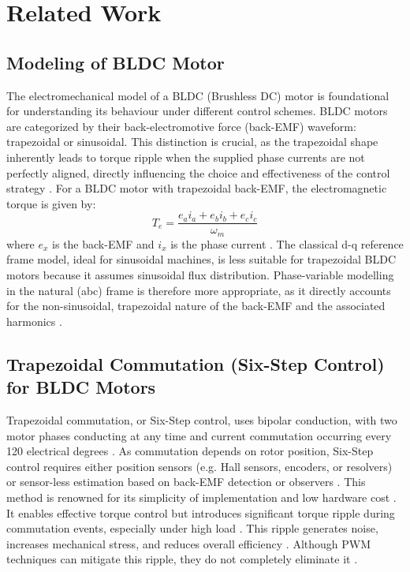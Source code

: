 \section{Related Work}
\label{sec:relatedwork}

\subsection{Modeling of BLDC Motor}
The electromechanical model of a BLDC (Brushless DC) motor is foundational for understanding its behaviour under different control schemes. BLDC motors are categorized by their back-electromotive force (back-EMF) waveform: trapezoidal or sinusoidal. This distinction is crucial, as the trapezoidal shape inherently leads to torque ripple when the supplied phase currents are not perfectly aligned, directly influencing the choice and effectiveness of the control strategy \cite{patil_analysis_2025}. For a BLDC motor with trapezoidal back-EMF, the electromagnetic torque is given by:
\[
T_e = \frac{e_a i_a + e_b i_b + e_c i_c}{\omega_m}
\]
where \( e_x \) is the back-EMF and \( i_x \) is the phase current \cite{li_quantitative_2019}. The classical d-q reference frame model, ideal for sinusoidal machines, is less suitable for trapezoidal BLDC motors because it assumes sinusoidal flux distribution. Phase-variable modelling in the natural (abc) frame is therefore more appropriate, as it directly accounts for the non-sinusoidal, trapezoidal nature of the back-EMF and the associated harmonics \cite{mohammd_taher_new_2021}.

\subsection{Trapezoidal Commutation (Six-Step Control) for BLDC Motors}
Trapezoidal commutation, or Six-Step control, uses bipolar conduction, with two motor phases conducting at any time and current commutation occurring every 120 electrical degrees \cite{gieras_modern_2023}. As commutation depends on rotor position, Six-Step control requires either position sensors (e.g. Hall sensors, encoders, or resolvers) or sensor-less estimation based on back-EMF detection or observers \cite{gieras_modern_2023, gasc_conception_2004}.  This method is renowned for its simplicity of implementation and low hardware cost \cite{bhatiya_bldc_2024}. It enables effective torque control but introduces significant torque ripple during commutation events, especially under high load \cite{jomsa-nga_torque_2024}. This ripple generates noise, increases mechanical stress, and reduces overall efficiency \cite{mohammd_taher_new_2021}. Although PWM techniques can mitigate this ripple, they do not completely eliminate it \cite{li_quantitative_2019}.

